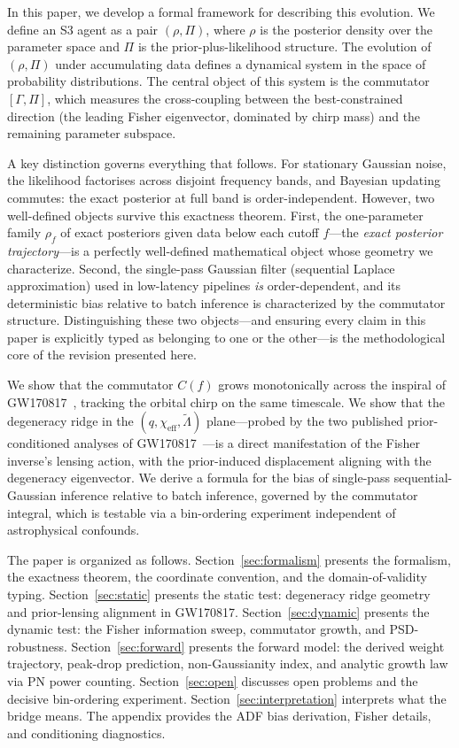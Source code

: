 \documentclass[twocolumn,prd,showpacs,superscriptaddress]{revtex4-2}
\begin{document}
In this paper, we develop a formal framework for describing this evolution. We define an S3 agent as a pair $(\rho, \Pi)$, where $\rho$ is the posterior density over the parameter space and $\Pi$ is the prior-plus-likelihood structure. The evolution of $(\rho, \Pi)$ under accumulating data defines a dynamical system in the space of probability distributions. The central object of this system is the commutator $[\Gamma, \Pi]$, which measures the cross-coupling between the best-constrained direction (the leading Fisher eigenvector, dominated by chirp mass) and the remaining parameter subspace.

A key distinction governs everything that follows. For stationary Gaussian noise, the likelihood factorises across disjoint frequency bands, and Bayesian updating commutes: the exact posterior at full band is order-independent. However, two well-defined objects survive this exactness theorem. First, the one-parameter family $\rho_f$ of exact posteriors given data below each cutoff $f$---the \emph{exact posterior trajectory}---is a perfectly well-defined mathematical object whose geometry we characterize. Second, the single-pass Gaussian filter (sequential Laplace approximation) used in low-latency pipelines \emph{is} order-dependent, and its deterministic bias relative to batch inference is characterized by the commutator structure. Distinguishing these two objects---and ensuring every claim in this paper is explicitly typed as belonging to one or the other---is the methodological core of the revision presented here.

We show that the commutator $C(f)$ grows monotonically across the inspiral of GW170817~\cite{abbott2017gw170817}, tracking the orbital chirp on the same timescale. We show that the degeneracy ridge in the $(q, \chi_{\text{eff}}, \tilde{\Lambda})$ plane---probed by the two published prior-conditioned analyses of GW170817~\cite{abbott2019gw170817_params}---is a direct manifestation of the Fisher inverse's lensing action, with the prior-induced displacement aligning with the degeneracy eigenvector. We derive a formula for the bias of single-pass sequential-Gaussian inference relative to batch inference, governed by the commutator integral, which is testable via a bin-ordering experiment independent of astrophysical confounds.

The paper is organized as follows. Section~\ref{sec:formalism} presents the formalism, the exactness theorem, the coordinate convention, and the domain-of-validity typing. Section~\ref{sec:static} presents the static test: degeneracy ridge geometry and prior-lensing alignment in GW170817. Section~\ref{sec:dynamic} presents the dynamic test: the Fisher information sweep, commutator growth, and PSD-robustness. Section~\ref{sec:forward} presents the forward model: the derived weight trajectory, peak-drop prediction, non-Gaussianity index, and analytic growth law via PN power counting. Section~\ref{sec:open} discusses open problems and the decisive bin-ordering experiment. Section~\ref{sec:interpretation} interprets what the bridge means. The appendix provides the ADF bias derivation, Fisher details, and conditioning diagnostics.
\end{document}
